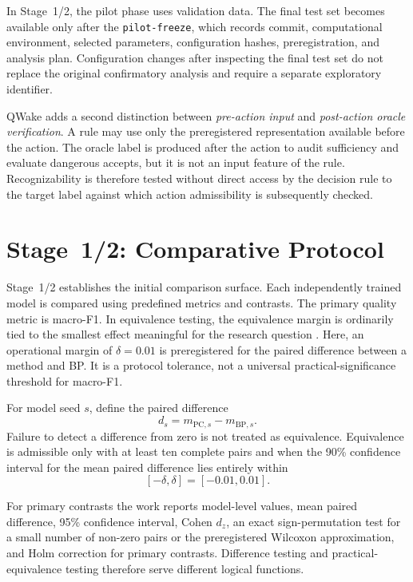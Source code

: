 In Stage~1/2, the pilot phase uses validation data. The final test set becomes
available only after the \texttt{pilot-freeze}, which records commit, computational
environment, selected parameters, configuration hashes, preregistration, and analysis
plan. Configuration changes after inspecting the final test set do not replace the
original confirmatory analysis and require a separate exploratory identifier.

QWake adds a second distinction between \emph{pre-action input} and
\emph{post-action oracle verification}. A rule may use only the preregistered
representation available before the action. The oracle label is produced after the
action to audit sufficiency and evaluate dangerous accepts, but it is not an input
feature of the rule. Recognizability is therefore tested without direct access by the
decision rule to the target label against which action admissibility is subsequently
checked.

\section{Stage~1/2: Comparative Protocol}
\label{sec:method-stage12-en}

Stage~1/2 establishes the initial comparison surface. Each independently trained model
is compared using predefined metrics and contrasts. The primary quality metric is
macro-F1. In equivalence testing, the equivalence margin is ordinarily tied to the
smallest effect meaningful for the research question \cite{lakens2017equivalence}.
Here, an operational margin of \(\delta=0.01\) is preregistered for the paired
difference between a method and BP. It is a protocol tolerance, not a universal
practical-significance threshold for macro-F1.

For model seed \(s\), define the paired difference
\[
  d_s=m_{\mathrm{PC},s}-m_{\mathrm{BP},s}.
\]
Failure to detect a difference from zero is not treated as equivalence. Equivalence is
admissible only with at least ten complete pairs and when the 90\% confidence interval
for the mean paired difference lies entirely within
\[
  [-\delta,\delta]=[-0.01,0.01].
\]

For primary contrasts the work reports model-level values, mean paired difference,
95\% confidence interval, Cohen \(d_z\), an exact sign-permutation test for a small
number of non-zero pairs or the preregistered Wilcoxon approximation, and Holm
correction for primary contrasts. Difference testing and practical-equivalence testing
therefore serve different logical functions.

